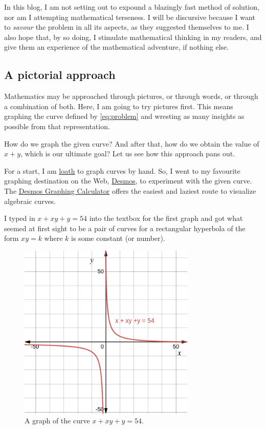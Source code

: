 \documentclass[
  a4paper,
]{article}
\begin{document}
In this blog, I am not setting out to expound a blazingly fast method of
solution, nor am I attempting mathematical terseness. I will be
discursive because I want to \emph{savour} the problem in all its
aspects, as they suggested themselves to me. I also hope that, by so
doing, I stimulate mathematical thinking in my readers, and give them an
experience of the mathematical adventure, if nothing else.

\hypertarget{a-pictorial-approach}{%
\subsection{A pictorial approach}\label{a-pictorial-approach}}

Mathematics may be approached through pictures, or through words, or
through a combination of both. Here, I am going to try pictures first.
This means graphing the curve defined by \cref{eq:problem} and wresting
as many insights as possible from that representation.

How do we graph the given curve? And after that, how do we obtain the
value of \(x + y\), which is our ultimate goal? Let us see how this
approach pans out.

For a start, I am \href{https://www.thefreedictionary.com/loath}{loath}
to graph curves by hand. So, I went to my favourite graphing destination
on the Web, \href{https://www.desmos.com}{Desmos}, to experiment with
the given curve. The \href{https://www.desmos.com/calculator}{Desmos
Graphing Calculator} offers the easiest and laziest route to visualize
algebraic curves.

I typed in
\href{https://www.desmos.com/calculator/nwkikstcm6}{\(x + xy + y = 54\)}
into the textbox for the first graph and got what seemed at first sight
to be a pair of curves for a rectangular hyperbola of the form
\(xy = k\) where \(k\) is some constant (or number).

\begin{figure}
\hypertarget{fig:one}{%
\centering
\includegraphics[width=0.75\textwidth,height=\textheight]{images/olympiad-one.png}
\caption{A graph of the curve \(x + xy + y = 54\).}\label{fig:one}
}
\end{figure}
\end{document}
